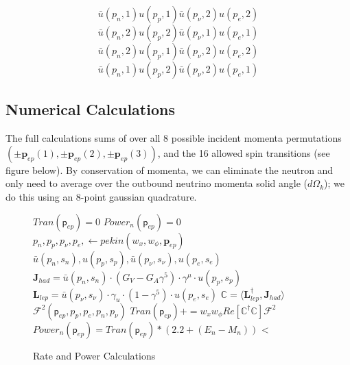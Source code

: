 \documentclass[%
 aip,
 jmp,%
 amsmath,amssymb,
 reprint,%
]{revtex4-1}
\begin{document}
$$\bar{u}(p_{n},1)u(p_{p},1)\bar{u}(p_{\nu},2)u(p_{e},2)$$
$$\bar{u}(p_{n},2)u(p_{p},2)\bar{u}(p_{\nu},1)u(p_{e},1)$$
$$\bar{u}(p_{n},2)u(p_{p},1)\bar{u}(p_{\nu},2)u(p_{e},2)$$
$$\bar{u}(p_{n},1)u(p_{p},2)\bar{u}(p_{\nu},2)u(p_{e},1)$$


\subsection{Numerical Calculations}

 The full calculations sums of over all 8 possible incident momenta permutations
  $(\pm\mathbf{p}_{ep}(1),\pm\mathbf{p}_{ep}(2),\pm\mathbf{p}_{ep}(3) )$,
and the 16 allowed spin transitions (see figure below). By conservation of momenta, we can eliminate the neutron and only need to average over the outbound neutrino momenta solid angle ($d\Omega_k$); we do this using an 8-point gaussian quadrature. 


 \begin{figure}
 \begin{minipage}{\linewidth}
\begin{algorithm}[H]
\caption{Rate and Power Calculations}\label{code}
\begin{algorithmic}[1]
\State $Tran(\mathsf{p}_{ep})=0$
\State $Power_{n}(\mathsf{p}_{ep})=0$
\State $p_{n},p_{p}, p_{\nu},p_{e}, \gets pekin(w_{x},w_{\phi},\mathbf{p}_{ep})$
\State $\bar{u}(p_{n},s_{n}),u(p_{p},s_{p}), \bar{u}(p_{\nu},s_{\nu}), u(p_{e},s_{e})$
\State $\mathbf{J}_{had}=\bar{u}(p_{n},s_{n})\cdot(G_{V}-G_{A}\gamma^{5})\cdot\gamma^{\mu}\cdot u(p_{p},s_{p})$
\State $\mathbf{L}_{lep}=\bar{u}(p_{\nu},s_{\nu})\cdot\gamma_{u}\cdot(1-\gamma^{5})\cdot u(p_{e},s_{e})$
\EndFor
\State $\mathbb{C}=\langle\mathbf{L}^{\dagger}_{lep},\mathbf{J}_{had}\rangle$
\EndFor
\EndFor
\State $\mathcal{F}^{2}(\mathsf{p}_{ep},p_{p},p_{e}, p_{n}, p_{\nu})$
\State $Tran(\mathsf{p}_{ep})+=w_{x}w_{\phi}Re[\mathbb{C}^{\dagger}\mathbb{C}]\mathcal{F}^{2}$
\EndFor
\State $Power_{n}(\mathsf{p}_{ep})=Tran(\mathsf{p}_{ep})*(2.2+(E_{n}-M_{n}))$
\EndFor<
\end{algorithmic}
\end{algorithm}
\end{minipage}
\end{figure}
\end{document}
